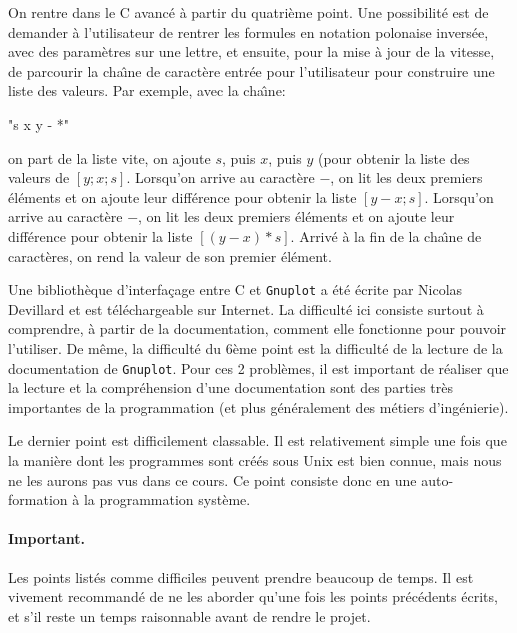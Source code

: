 \documentclass[a4paper]{article}
\begin{document}
On rentre dans le C avanc{\'e} {\`a} partir du quatri{\`e}me point. Une
possibilit{\'e} est de demander {\`a} l'utilisateur de rentrer les formules en
notation polonaise invers{\'e}e, avec des param{\`e}tres sur une lettre, et
ensuite, pour la mise {\`a} jour de la vitesse, de parcourir la cha{\^\i}ne de
caract{\`e}re entr{\'e}e pour l'utilisateur pour construire une liste des
valeurs. Par exemple, avec la cha{\^\i}ne:
\begin{center}
  "s x y - *"
\end{center}
on part de la liste vite, on ajoute $s$, puis $x$, puis $y$ (pour
obtenir la liste des valeurs de $[y;x;s]$. Lorsqu'on arrive au
caract{\`e}re $-$, on lit les deux premiers {\'e}l{\'e}ments et on ajoute leur
diff{\'e}rence pour obtenir la liste $[y-x;s]$. Lorsqu'on arrive au
caract{\`e}re $-$, on lit les deux premiers {\'e}l{\'e}ments et on ajoute leur
diff{\'e}rence pour obtenir la liste $[(y-x)*s]$. Arriv{\'e} {\`a} la fin de la
cha{\^\i}ne de caract{\`e}res, on rend la valeur de son premier {\'e}l{\'e}ment.

Une biblioth{\`e}que d'interfa{\c c}age entre C et \texttt{Gnuplot} a
{\'e}t{\'e} {\'e}crite par Nicolas Devillard et est
t{\'e}l{\'e}chargeable sur Internet. La difficult{\'e} ici consiste
surtout {\`a} comprendre, {\`a} partir de la documentation, comment
elle fonctionne pour pouvoir l'utiliser.  De m{\^e}me, la
difficult{\'e} du 6{\`e}me point est la difficult{\'e} de la lecture
de la documentation de \texttt{Gnuplot}.  Pour ces 2 probl{\`e}mes, il
est important de r{\'e}aliser que la lecture et la compr{\'e}hension
d'une documentation sont des parties tr{\`e}s importantes de la
programmation (et plus g{\'e}n{\'e}ralement des m{\'e}tiers
d'ing{\'e}nierie).

Le dernier point est difficilement classable. Il est relativement
simple une fois que la mani{\`e}re dont les programmes sont
cr{\'e}{\'e}s sous Unix est bien connue, mais nous ne les aurons pas
vus dans ce cours.  Ce point consiste donc en une auto-formation {\`a}
la programmation syst{\`e}me.

\paragraph{Important.} Les points list{\'e}s comme difficiles peuvent
prendre beaucoup de temps. Il est vivement recommand{\'e} de ne les
aborder qu'une fois les points pr{\'e}c{\'e}dents {\'e}crits, et s'il
reste un temps raisonnable avant de rendre le projet.
\end{document}
